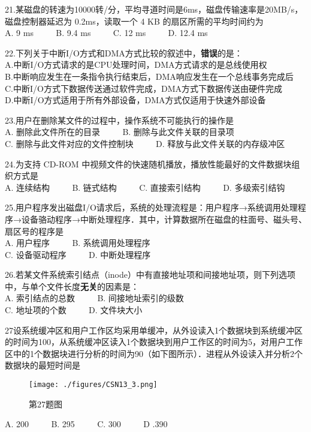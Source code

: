 21.某磁盘的转速为10000转/分，平均寻道时间是6ms，磁盘传输速率是20MB/s，磁盘控制器延迟为 0.2ms，读取一个 4 KB 的扇区所需的平均时间约为 \\
A. 9 ms $\qquad$ B. 9.4 ms $\qquad$ C. 12 ms $\qquad$ D. 12.4 ms

22.下列关于中断I/O方式和DMA方式比较的叙述中，\textbf{错误}的是： \\
A.中断I/O方式请求的是CPU处理时间，DMA方式请求的是总线使用权 \\
B.中断响应发生在一条指令执行结束后，DMA响应发生在一个总线事务完成后 \\
C.中断I/O方式下数据传送通过软件完成，DMA方式下数据传送由硬件完成 \\
D.中断I/O方式适用于所有外部设备，DMA方式仅适用于快速外部设备

23.用户在删除某文件的过程中，操作系统不可能执行的操作是 \\
A. 删除此文件所在的目录 $\qquad$ B. 删除与此文件关联的目录项 \\
C. 删除与此文件对应的文件控制块 $\qquad$ D. 释放与此文件关联的内存级冲区

24.为支持 CD-ROM 中视频文件的快速随机播放，播放性能最好的文件数据块组织方式是 \\
A. 连续结构 $\qquad$ B. 链式结构 $\qquad$ C. 直接索引结构 $\qquad$ D. 多级索引结钩

25.用户程序发出磁盘I/O请求后，系统的处理流程是：用户程序→系统调用处理程序→设备骆动程序→中断处理程序．其中，计算数据所在磁盘的柱面号、磁头号、扇区号的程序是 \\
A. 用户程序 $\qquad$ B. 系统调用处理程序 \\
C. 设备驱动程序 $\qquad$ D. 中断处理程序

26.若某文件系统索引结点（inode）中有直接地址项和间接地址项，则下列选项中，与单个文件长度\textbf{无关}的因素是： \\
A. 索引结点的总数 $\qquad$ B. 间接地址索引的级数 \\
C. 地址项的个数 $\qquad$ D. 文件块大小

27设系统缓冲区和用户工作区均采用单缓冲，从外设读入1个数据块到系统缓冲区的时间为100，从系统缓冲区读入1个数据块到用户工作区的时间为5，对用户工作区中的1个数据块进行分析的时间为90（如下图所示）．进程从外设读入并分析2个数据块的最短时间是 \\
\begin{figure}[ht]
\centering
\texttt{[image: ./figures/CSN13\_3.png]}
\caption{第27题图} \label{CSN13_fig3}
\end{figure}
A. 200 $\qquad$ B. 295 $\qquad$ C. 300 $\qquad$ D .390

